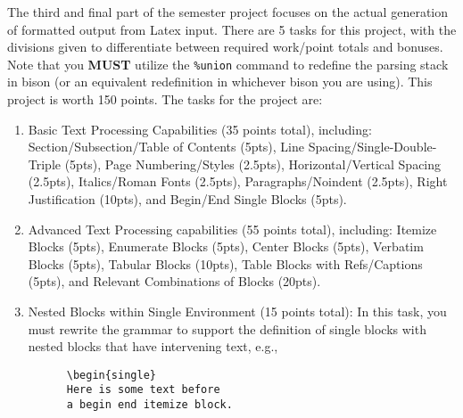 The third and final part of the semester project focuses on the actual
generation of formatted output from Latex input.  There are 5 tasks
for this project, with the divisions given to differentiate between 
required work/point totals and bonuses.  Note that you {\bf MUST} utilize the
{\tt \%union} command to redefine the parsing stack in bison (or an 
equivalent redefinition in whichever bison you are using).
This project is worth 150 points.   The tasks for the project are:
\begin{enumerate}
\item Basic Text Processing Capabilities (35 points total),
      including: Section/Subsection/Table of Contents (5pts),
      Line Spacing/Single-Double-Triple (5pts), Page Numbering/Styles (2.5pts),
      Horizontal/Vertical Spacing (2.5pts), Italics/Roman Fonts (2.5pts),
      Paragraphs/Noindent (2.5pts), Right Justification (10pts), and
      Begin/End Single Blocks (5pts).
\item Advanced Text Processing capabilities (55 points total),
      including: Itemize Blocks (5pts), Enumerate Blocks (5pts),
      Center Blocks (5pts), Verbatim Blocks (5pts), Tabular Blocks (10pts),
      Table Blocks with Refs/Captions (5pts), and
      Relevant Combinations of Blocks (20pts).
\item Nested Blocks within Single Environment (15 points total): In this task, you must
      rewrite the grammar to support the definition of single blocks with 
      nested blocks that have intervening text, e.g.,
      \begin{small}
      \begin{verbatim}
      \begin{single}
      Here is some text before 
      a begin end itemize block.


\end{verbatim}
\end{small}
\end{enumerate}
